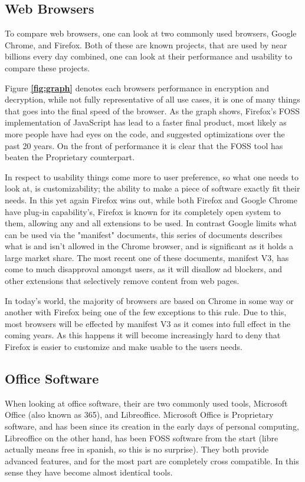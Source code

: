 \documentclass[a4paper,12pt]{article}
\begin{document}
{\subsection{Web Browsers} To compare web browsers, one can look at two commonly used browsers, Google Chrome,
and Firefox. Both of these are known projects, that are used by near billions every day combined, one can look at
their performance and usability to compare these projects.

Figure \textbf{\ref{fig:graph}} denotes each browsers performance in encryption and decryption, while not fully
representative of all use cases, it is one of many things that goes into the final speed of the browser. As the
graph shows, Firefox's FOSS implementation of JavaScript has lead to a faster final product, most likely as more
people have had eyes on the code, and suggested optimizations over the past 20 years. On the front of performance
it is clear that the FOSS tool has beaten the Proprietary counterpart.

In respect to usability things come more to user preference, so what one needs to look at, is customizability; the
ability to make a piece of software exactly fit their needs. In this yet again Firefox wins out, while both Firefox
and Google Chrome have plug-in capability's, Firefox is known for its completely open system to them, allowing any
and all extensions to be used. In contrast Google limits what can be used via the "manifest" documents, this series
of documents describes what is and isn't allowed in the Chrome browser, and is significant as it holds a large
market share. The most recent one of these documents, manifest V3\cite{MANIFESTv3}, has come to much disapproval
amongst users, as it will disallow ad blockers, and other extensions that selectively remove content from web pages.

In today's world, the majority of browsers are based on Chrome in some way or another with Firefox being one of
the few exceptions to this rule. Due to this, most browsers will be effected by manifest V3 as it comes into full
effect in the coming years.  As this happens it will become increasingly hard to deny that Firefox is easier to
customize and make usable to the users needs.

\subsection{Office Software} When looking at office software, their are two commonly used tools, Microsoft Office
(also known as 365), and Libreoffice.  Microsoft Office is Proprietary software, and has been since its creation
in the early days of personal computing, Libreoffice on the other hand, has been FOSS software from the start
(libre actually means free in spanish, so this is no surprise).  They both provide advanced features, and for the
most part are completely cross compatible. In this sense they have become almost identical tools.

}
\end{document}
